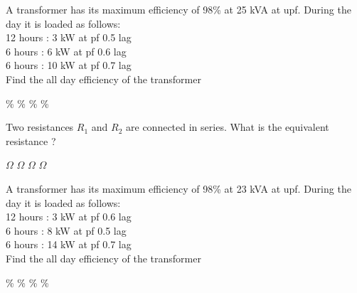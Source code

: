 \documentclass{exam}
\begin{document}
\begin{multicols}{2}
\begin{questions}
\question A transformer has its maximum efficiency of 98\% at 25 kVA at upf. During the day it is loaded as follows:\\
12 hours : 3 kW at pf 0.5 lag\\
6 hours : 6 kW at pf 0.6 lag\\
6 hours : 10 kW at pf 0.7 lag\\
Find the all day efficiency of the transformer
\begin{randomizechoices}
 \%
 \%
 \%
 \%
\end{randomizechoices}

\question Two resistances $R_1$ and $R_2$ are connected in series. What is the equivalent resistance ?

\begin{choices}
  $\Omega$
   $\Omega$
    $\Omega$
 $\Omega$  
\end{choices}

\question A transformer has its maximum efficiency of 98\% at 23 kVA at upf. During the day it is loaded as follows:\\
12 hours : 3 kW at pf 0.6 lag\\
6 hours : 8 kW at pf 0.5 lag\\
6 hours : 14 kW at pf 0.7 lag\\
Find the all day efficiency of the transformer
\begin{randomizechoices}
 \%
 \%
 \%
 \%
\end{randomizechoices}


\end{questions}
\end{multicols}
\printkeytable	  
\end{document}
